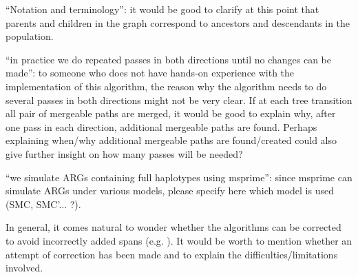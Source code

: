 \begin{point}{\revref} %
 ``Notation and terminology'': it would be good to clarify at this point that parents and children in the graph correspond to ancestors and descendants in the population.
\end{point}


\begin{point}{\revref} %
 ``in practice we do repeated passes in both directions until no changes can be made'': to someone who does not have hands-on experience with the implementation of this algorithm, the reason why the algorithm needs to do several passes in both directions might not be very clear. If at each tree transition all pair of mergeable paths are merged, it would be good to explain why, after one pass in each direction, additional mergeable paths are found. Perhaps explaining when/why additional mergeable paths are found/created could also give further insight on how many passes will be needed?
\end{point}


\begin{point}{\revref} %
 ``we simulate ARGs containing full haplotypes using msprime'': since msprime can simulate ARGs under various models, please specify here which model is used (SMC, SMC'... ?).
\end{point}


\begin{point}{}
In general, it comes natural to wonder whether the algorithms can be corrected to avoid incorrectly added spans
(e.g. \revref). %
It would be worth to mention whether an attempt of correction has been made and to explain the difficulties/limitations involved.
\end{point}


